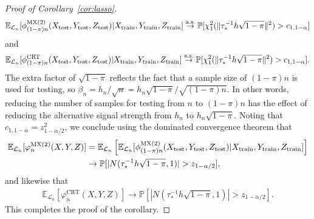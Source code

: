 \documentclass[12pt]{article}
\theoremstyle{definition}
\theoremstyle{remark}
\newcommand{\srx}{X}
\newcommand{\srz}{Z}
\newcommand{\sry}{Y}
\begin{document}
\begin{proof}[Proof of Corollary~\ref{cor:lasso}]
\begin{equation*}
	\begin{split}
		\mathbb E_{\mathcal L_n}[\phi^{\textnormal{MX(2)}}_{(1-\pi)n}(\srx_{\text{test}}, \sry_{\text{test}}, \srz_{\text{test}})|\srx_{\text{train}}, \sry_{\text{train}}, \srz_{\text{train}}] \overset{\text{a.s.}}\rightarrow \mathbb P[\chi^2_1(\|\tau_*^{-1} h\sqrt{1-\pi}\|^2) > c_{1,1-\alpha}]
	\end{split}
\end{equation*}
and
\begin{equation*}
	\begin{split}
		\mathbb E_{\mathcal L_n}[\phi^{\textnormal{CRT}}_{(1-\pi)n}(\srx_{\text{test}}, \sry_{\text{test}}, \srz_{\text{test}})|\srx_{\text{train}}, \sry_{\text{train}}, \srz_{\text{train}}] \overset{\text{a.s.}}\rightarrow \mathbb P[\chi^2_1(\|\tau_*^{-1} h\sqrt{1-\pi}\|^2) > c_{1,1-\alpha}].
	\end{split}
\end{equation*}
The extra factor of $\sqrt{1-\pi}$ reflects the fact that a sample size of $(1-\pi)n$ is used for testing, so $\beta_n = h_n/\sqrt{n} = h_n\sqrt{1-\pi}/\sqrt{(1-\pi)n}$. In other words, reducing the number of samples for testing from $n$ to $(1-\pi)n$ has the effect of reducing the alternative signal strength from $h_n$ to $h_n \sqrt{1-\pi}$. Noting that $c_{1,1-\alpha} = z^2_{1-\alpha/2}$, we conclude using the dominated convergence theorem that
\begin{equation*}
	\begin{split}
		\mathbb E_{\mathcal L_n}[\varphi^{\textnormal{MX(2)}}_{n}(\srx, \sry, \srz)] &=  
		\mathbb E_{\mathcal L_n}\left[\mathbb E_{\mathcal L_n}[\phi^{\textnormal{MX(2)}}_{(1-\pi)n}(\srx_{\text{test}}, \sry_{\text{test}}, \srz_{\text{test}})|\srx_{\text{train}}, \sry_{\text{train}}, \srz_{\text{train}}]\right] \\
		&\rightarrow \mathbb P[|N(\tau_*^{-1} h\sqrt{1-\pi},1)| > z_{1-\alpha/2}],
	\end{split}
\end{equation*}
and likewise that
\begin{equation*}
	\begin{split}
		\mathbb E_{\mathcal L_n}[\varphi^{\text{CRT}}_{n}(\srx, \sry, \srz)] \rightarrow \mathbb P[|N(\tau_*^{-1} h\sqrt{1-\pi},1)| > z_{1-\alpha/2}].
	\end{split}
\end{equation*}
This completes the proof of the corollary.
\end{proof}
\end{document}
